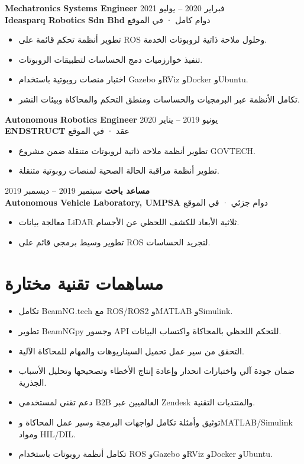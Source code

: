 \documentclass[11pt,a4paper]{article}
\newcommand{\en}[1]{\textenglish{#1}}
\begin{document}
\textbf{\color{PrimaryColor}\en{Mechatronics Systems Engineer}} \hfill فبراير 2020 -- يوليو 2021\\
\textbf{\en{Ideasparq Robotics Sdn Bhd}} \hfill دوام كامل · في الموقع

\begin{itemize}
    \item تطوير أنظمة تحكم قائمة على \en{ROS} وحلول ملاحة ذاتية لروبوتات الخدمة.
    \item تنفيذ خوارزميات دمج الحساسات لتطبيقات الروبوتات.
    \item اختبار منصات روبوتية باستخدام \en{Gazebo} و\en{RViz} و\en{Docker} و\en{Ubuntu}.
    \item تكامل الأنظمة عبر البرمجيات والحساسات ومنطق التحكم والمحاكاة وبيئات النشر.
\end{itemize}

\textbf{\color{PrimaryColor}\en{Autonomous Robotics Engineer}} \hfill يونيو 2019 -- يناير 2020\\
\textbf{\en{ENDSTRUCT}} \hfill عقد · في الموقع

\begin{itemize}
    \item تطوير أنظمة ملاحة ذاتية لروبوتات متنقلة ضمن مشروع \en{GOVTECH}.
    \item تطوير أنظمة مراقبة الحالة الصحية لمنصات روبوتية متنقلة.
\end{itemize}

\textbf{\color{PrimaryColor}مساعد باحث} \hfill سبتمبر 2019 -- ديسمبر 2019\\
\textbf{\en{Autonomous Vehicle Laboratory, UMPSA}} \hfill دوام جزئي · في الموقع

\begin{itemize}
    \item معالجة بيانات \en{LiDAR} ثلاثية الأبعاد للكشف اللحظي عن الأجسام.
    \item تطوير وسيط برمجي قائم على \en{ROS} لتجريد الحساسات.
\end{itemize}

\section*{مساهمات تقنية مختارة}

\begin{itemize}
    \item تكامل \en{BeamNG.tech} مع \en{ROS/ROS2} و\en{MATLAB} و\en{Simulink}.
    \item تطوير \en{BeamNGpy} وجسور \en{API} للتحكم اللحظي بالمحاكاة واكتساب البيانات.
    \item التحقق من سير عمل تحميل السيناريوهات والمهام للمحاكاة الآلية.
    \item ضمان جودة آلي واختبارات انحدار وإعادة إنتاج الأخطاء وتصحيحها وتحليل الأسباب الجذرية.
    \item دعم تقني لمستخدمي \en{B2B} العالميين عبر \en{Zendesk} والمنتديات التقنية.
    \item توثيق وأمثلة تكامل لواجهات البرمجة وسير عمل المحاكاة و\en{MATLAB/Simulink} ومواد \en{HIL/DIL}.
    \item تكامل أنظمة روبوتات باستخدام \en{ROS} و\en{Gazebo} و\en{RViz} و\en{Docker} و\en{Ubuntu}.
\end{itemize}
\end{document}
